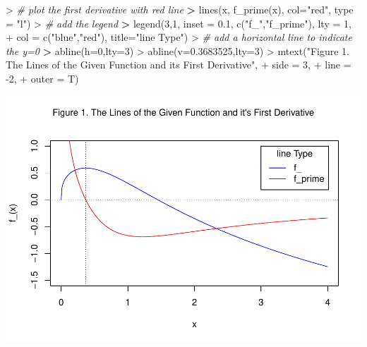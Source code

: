 \documentclass[
]{article}
\newenvironment{Shaded}{\begin{snugshade}}{\end{snugshade}}
\newcommand{\AttributeTok}[1]{\textcolor[rgb]{0.77,0.63,0.00}{#1}}
\newcommand{\CommentTok}[1]{\textcolor[rgb]{0.56,0.35,0.01}{\textit{#1}}}
\newcommand{\DecValTok}[1]{\textcolor[rgb]{0.00,0.00,0.81}{#1}}
\newcommand{\ErrorTok}[1]{\textcolor[rgb]{0.64,0.00,0.00}{\textbf{#1}}}
\newcommand{\FloatTok}[1]{\textcolor[rgb]{0.00,0.00,0.81}{#1}}
\newcommand{\FunctionTok}[1]{\textcolor[rgb]{0.00,0.00,0.00}{#1}}
\newcommand{\NormalTok}[1]{#1}
\newcommand{\SpecialCharTok}[1]{\textcolor[rgb]{0.00,0.00,0.00}{#1}}
\newcommand{\StringTok}[1]{\textcolor[rgb]{0.31,0.60,0.02}{#1}}
\begin{document}
\begin{Shaded}
\begin{Highlighting}[]
\SpecialCharTok{\textgreater{}} \CommentTok{\# plot the first derivative with red line}
\ErrorTok{\textgreater{}} \FunctionTok{lines}\NormalTok{(x, }\FunctionTok{f\_prime}\NormalTok{(x), }\AttributeTok{col=}\StringTok{"red"}\NormalTok{, }\AttributeTok{type =} \StringTok{"l"}\NormalTok{)}
\SpecialCharTok{\textgreater{}} \CommentTok{\# add the legend}
\ErrorTok{\textgreater{}} \FunctionTok{legend}\NormalTok{(}\DecValTok{3}\NormalTok{,}\DecValTok{1}\NormalTok{, }\AttributeTok{inset =} \FloatTok{0.1}\NormalTok{, }\FunctionTok{c}\NormalTok{(}\StringTok{"f\_"}\NormalTok{,}\StringTok{"f\_prime"}\NormalTok{), }\AttributeTok{lty =} \DecValTok{1}\NormalTok{, }
\SpecialCharTok{+}        \AttributeTok{col =} \FunctionTok{c}\NormalTok{(}\StringTok{"blue"}\NormalTok{,}\StringTok{"red"}\NormalTok{), }\AttributeTok{title=}\StringTok{"line Type"}\NormalTok{)}
\SpecialCharTok{\textgreater{}} \CommentTok{\# add a horizontal line to indicate the y=0}
\ErrorTok{\textgreater{}} \FunctionTok{abline}\NormalTok{(}\AttributeTok{h=}\DecValTok{0}\NormalTok{,}\AttributeTok{lty=}\DecValTok{3}\NormalTok{)}
\SpecialCharTok{\textgreater{}} \FunctionTok{abline}\NormalTok{(}\AttributeTok{v=}\FloatTok{0.3683525}\NormalTok{,}\AttributeTok{lty=}\DecValTok{3}\NormalTok{)}
\SpecialCharTok{\textgreater{}} \FunctionTok{mtext}\NormalTok{(}\StringTok{"Figure 1. The Lines of the Given Function and it\textquotesingle{}s First Derivative"}\NormalTok{,}
\SpecialCharTok{+}       \AttributeTok{side =} \DecValTok{3}\NormalTok{,}
\SpecialCharTok{+}       \AttributeTok{line =} \SpecialCharTok{{-}}\DecValTok{2}\NormalTok{,}
\SpecialCharTok{+}       \AttributeTok{outer =}\NormalTok{ T)}
\end{Highlighting}
\end{Shaded}

\includegraphics{Homework_05_Pan-Lei_files/figure-latex/unnamed-chunk-2-1.pdf}
\end{document}
